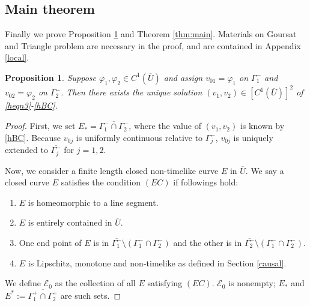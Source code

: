 \documentclass[11pt]{amsart}
\theoremstyle{plain}
\newtheorem{Prop}[Thm]{Proposition}
\theoremstyle{remark}
\numberwithin{equation}{section}
\numberwithin{Thm}{section}
\def\U{\overline{U}}
\begin{document}
\subsection{Main theorem}
Finally we prove Proposition \ref{prop:final} and Theorem \ref{thm:main}. Materials on Goursat and Triangle problem are necessary in the proof, and are contained in Appendix \ref{local}.
\begin{Prop}\label{prop:final} Suppose $\varphi_1,\varphi_2 \in C^1(\overline U)$ and assign $v_{01}=\varphi_1$ on $\Gamma_1^-$ and $v_{02}=\varphi_2$ on $\Gamma_2^-$. Then there exists the unique solution $(v_1,v_2)\in [C^1(\overline U)]^2$ of \eqref{heqn3}-\eqref{hBC}.
\end{Prop}
\begin{proof} 
First, we set $E_* = \overline{\Gamma_1^- \cap \Gamma_2^-}$, where the value of $(v_1,v_2)$ is known by \eqref{hBC}. Because $v_{0j}$ is uniformly continuous relative to $\Gamma^-_j$, $v_{0j}$ is uniquely extended to $\overline{\Gamma^-_j}$ for $j=1,2$. 

Now, we consider a finite length closed non-timelike curve $E$ in $\U$. We say a closed curve $E$ satisfies the condition $(EC)$ if followings hold:
\begin{enumerate} 
 \item $E$ is homeomorphic to a line segment.
 \item $E$ is entirely contained in $\U$.
 \item One end point of $E$ is in $\overline{\Gamma^-_1} \setminus (\Gamma_1^- \cap \Gamma_2^-)$ and the other is in $\overline{\Gamma^-_2} \setminus (\Gamma_1^- \cap \Gamma_2^-)$.
 \item $E$ is Lipschitz, monotone and non-timelike as defined in Section \ref{causal}.
\end{enumerate}
We define $\mathcal{E}_0$ as the collection of all $E$ satisfying $(EC)$. $\mathcal{E}_0$ is nonempty; $E_*$ and $E^*:=\overline{\Gamma^+_1 \cap \Gamma^+_2}$ are such sets.


\end{proof}
\end{document}
